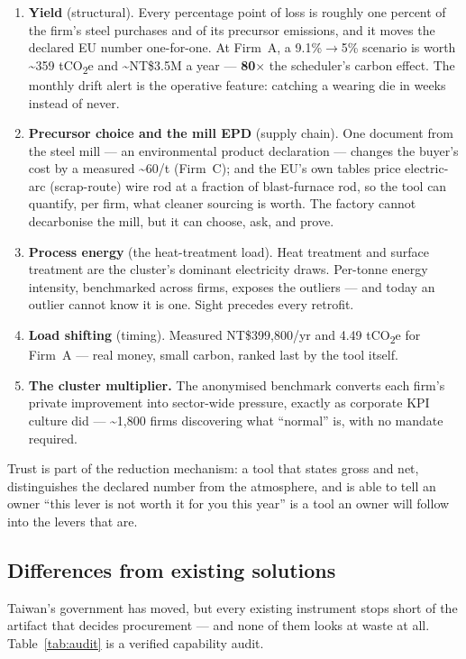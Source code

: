 \documentclass[11pt]{article}
\newcommand{\euro}{\texteuro}
\begin{document}
\begin{enumerate}[leftmargin=1.6em,itemsep=2pt,topsep=3pt]
\item \textbf{Yield} (structural). Every percentage point of loss is roughly one percent of the firm's steel purchases and of its precursor emissions, and it moves the declared EU number one-for-one. At Firm~A, a 9.1\%$\rightarrow$5\% scenario is worth \textasciitilde359 tCO\textsubscript{2}e and \textasciitilde NT\$3.5M a year --- \textbf{80$\times$} the scheduler's carbon effect. The monthly drift alert is the operative feature: catching a wearing die in weeks instead of never.
\item \textbf{Precursor choice and the mill EPD} (supply chain). One document from the steel mill --- an environmental product declaration --- changes the buyer's cost by a measured \textasciitilde\euro{}60/t (Firm~C); and the EU's own tables price electric-arc (scrap-route) wire rod at a fraction of blast-furnace rod, so the tool can quantify, per firm, what cleaner sourcing is worth. The factory cannot decarbonise the mill, but it can choose, ask, and prove.
\item \textbf{Process energy} (the heat-treatment load). Heat treatment and surface treatment are the cluster's dominant electricity draws. Per-tonne energy intensity, benchmarked across firms, exposes the outliers --- and today an outlier cannot know it is one. Sight precedes every retrofit.
\item \textbf{Load shifting} (timing). Measured NT\$399{,}800/yr and 4.49 tCO\textsubscript{2}e for Firm~A --- real money, small carbon, ranked last by the tool itself.
\item \textbf{The cluster multiplier.} The anonymised benchmark converts each firm's private improvement into sector-wide pressure, exactly as corporate KPI culture did --- \textasciitilde1{,}800 firms discovering what ``normal'' is, with no mandate required.
\end{enumerate}

Trust is part of the reduction mechanism: a tool that states gross and net, distinguishes the declared number from the atmosphere, and is able to tell an owner ``this lever is not worth it for you this year'' is a tool an owner will follow into the levers that are.

\subsection{Differences from existing solutions}
Taiwan's government has moved, but every existing instrument stops short of the artifact that decides procurement --- and none of them looks at waste at all. Table~\ref{tab:audit} is a verified capability audit.
\end{document}
